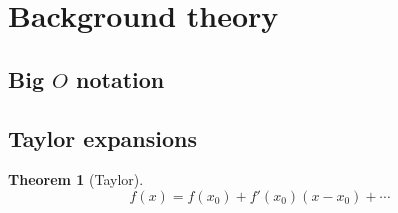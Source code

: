 \documentclass[11pt, a4paper]{article}
\theoremstyle{break}
\newtheorem{thm}{Theorem}[section]
\begin{document}
\appendix
\section{Background theory}
\subsection{\texorpdfstring{Big $O$}{Big O} notation}\label{sec:bigO}
\subsection{Taylor expansions}\label{sec:taylor}
\begin{thm}[Taylor]\label{thm:taylor}
	\[f(x)=f(x_0)+f'(x_0)(x-x_0) + \cdots\]
\end{thm}

\nocite{*}



\label{lastpage}
\end{document}
